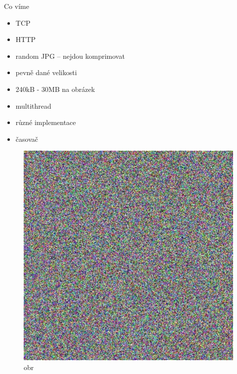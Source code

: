 \documentclass{beamer}
\begin{document}
\begin{frame}{Co víme}
\begin{itemize}
\item TCP
\item HTTP
\item random JPG -- nejdou komprimovat
\item pevně dané velikosti
\item 240kB - 30MB na obrázek
\item multithread
\item různé implementace
\item časovač
\end{itemize}

\begin{figure}[h!]
	    \centering
	    \includegraphics[width=1\textwidth]{random350x350.jpg}
	    \caption{obr}
	    \label{obr:obr}
\end{figure}

\end{frame}






\end{document}
